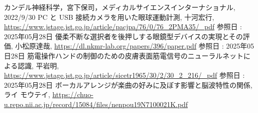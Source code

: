 \documentclass[dvipdfmx, titlepage, t]{jsarticle}
\begin{document}
\begin{thebibliography}{99} %

  \bibitem{}
    カンデル神経科学，宮下保司，メディカルサイエンスインターナショナル, 2022/9/30
  \bibitem{}
  PC と USB 接続カメラを用いた眼球運動計測, 十河宏行,  \url{https://www.jstage.jst.go.jp/article/pacjpa/76/0/76_2PMA35/_pdf} 参照日 : 2025年05月28日
  \bibitem{}
    優柔不断な選択者を後押しする眼鏡型デバイスの実現とその評価, 小松原達哉, \url{https://dl.nkmr-lab.org/papers/396/paper.pdf} 参照日 : 2025年05日28日
  \bibitem{}
  筋電操作ハンドの制御のための皮膚表面筋電信号のニューラルネットによる認識, 平岩明, \url{https://www.jstage.jst.go.jp/article/sicetr1965/30/2/30_2_216/_pdf} 参照日 : 2025年05月28日
  \bibitem
  ボーカルアレンジが楽曲の好みに及ぼす影響と脳波特性の関係, ライ モウテイ, \url{https://chuo-u.repo.nii.ac.jp/record/15084/files/nenpou19N7100021K.pdf}

\end{thebibliography}
    
\end{document}
